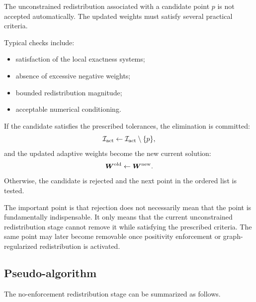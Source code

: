 \documentclass[11pt,a4paper]{article}
\begin{document}
The unconstrained redistribution associated with a candidate point $p$ is not
accepted automatically. The updated weights must satisfy several practical
criteria.

Typical checks include:
\begin{itemize}
    \item satisfaction of the local exactness systems;
    \item absence of excessive negative weights;
    \item bounded redistribution magnitude;
    \item acceptable numerical conditioning.
\end{itemize}

If the candidate satisfies the prescribed tolerances, the elimination is
committed:
\[
        \mathcal{I}_{\mathrm{act}}
        \gets
        \mathcal{I}_{\mathrm{act}}\setminus\{p\},
\]
and the updated adaptive weights become the new current solution:
\[
        \bm W^{\mathrm{old}}\gets\bm W^{\mathrm{new}}.
\]
Otherwise, the candidate is rejected and the next point in the ordered list is
tested.

The important point is that rejection does not necessarily mean that the point
is fundamentally indispensable. It only means that the current unconstrained
redistribution stage cannot remove it while satisfying the prescribed criteria.
The same point may later become removable once positivity enforcement or
graph-regularized redistribution is activated.

\subsection{Pseudo-algorithm}

The no-enforcement redistribution stage can be summarized as follows.
\end{document}
